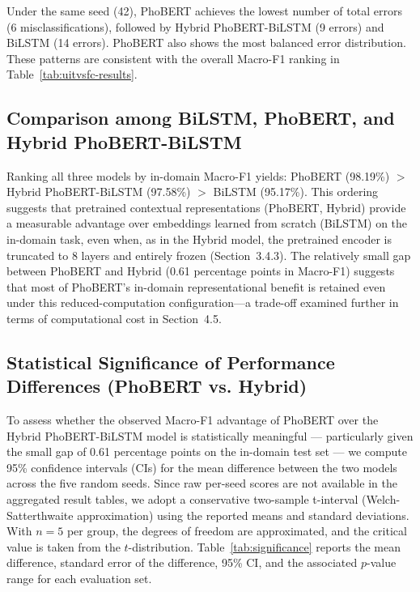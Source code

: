 \documentclass[12pt]{report} %
\begin{document}
Under the same seed (42), PhoBERT achieves the lowest number of total errors (6 misclassifications), followed by Hybrid PhoBERT-BiLSTM (9 errors) and BiLSTM (14 errors). PhoBERT also shows the most balanced error distribution. These patterns are consistent with the overall Macro-F1 ranking in Table~\ref{tab:uitvsfc-results}.

\subsection{Comparison among BiLSTM, PhoBERT, and Hybrid PhoBERT-BiLSTM}

Ranking all three models by in-domain Macro-F1 yields: PhoBERT (98.19\%) $>$ Hybrid PhoBERT-BiLSTM (97.58\%) $>$ BiLSTM (95.17\%). This ordering suggests that pretrained contextual representations (PhoBERT, Hybrid) provide a measurable advantage over embeddings learned from scratch (BiLSTM) on the in-domain task, even when, as in the Hybrid model, the pretrained encoder is truncated to 8 layers and entirely frozen (Section~3.4.3). The relatively small gap between PhoBERT and Hybrid (0.61 percentage points in Macro-F1) suggests that most of PhoBERT's in-domain representational benefit is retained even under this reduced-computation configuration---a trade-off examined further in terms of computational cost in Section~4.5.

\subsection{Statistical Significance of Performance Differences (PhoBERT vs. Hybrid)}

To assess whether the observed Macro-F1 advantage of PhoBERT over the Hybrid PhoBERT-BiLSTM model is statistically meaningful — particularly given the small gap of 0.61 percentage points on the in-domain test set — we compute 95\% confidence intervals (CIs) for the mean difference between the two models across the five random seeds. Since raw per-seed scores are not available in the aggregated result tables, we adopt a conservative two-sample t-interval (Welch-Satterthwaite approximation) using the reported means and standard deviations. With \(n=5\) per group, the degrees of freedom are approximated, and the critical value is taken from the \(t\)-distribution. Table~\ref{tab:significance} reports the mean difference, standard error of the difference, 95\% CI, and the associated \(p\)-value range for each evaluation set.
\end{document}
